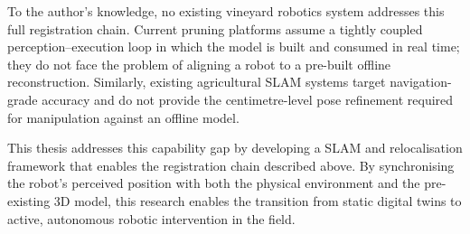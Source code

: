 To the author's knowledge, no existing vineyard robotics system addresses this full registration chain. Current pruning platforms assume a tightly coupled perception--execution loop in which the model is built and consumed in real time; they do not face the problem of aligning a robot to a pre-built offline reconstruction. Similarly, existing agricultural SLAM systems target navigation-grade accuracy and do not provide the centimetre-level pose refinement required for manipulation against an offline model.

This thesis addresses this capability gap by developing a SLAM and relocalisation framework that enables the registration chain described above. By synchronising the robot’s perceived position with both the physical environment and the pre-existing 3D model, this research enables the transition from static digital twins to active, autonomous robotic intervention in the field.